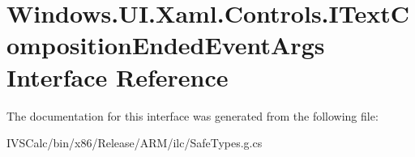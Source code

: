 \hypertarget{interface_windows_1_1_u_i_1_1_xaml_1_1_controls_1_1_i_text_composition_ended_event_args}{}\section{Windows.\+U\+I.\+Xaml.\+Controls.\+I\+Text\+Composition\+Ended\+Event\+Args Interface Reference}
\label{interface_windows_1_1_u_i_1_1_xaml_1_1_controls_1_1_i_text_composition_ended_event_args}


The documentation for this interface was generated from the following file\+:\begin{DoxyCompactItemize}
\item 
I\+V\+S\+Calc/bin/x86/\+Release/\+A\+R\+M/ilc/Safe\+Types.\+g.\+cs\end{DoxyCompactItemize}
